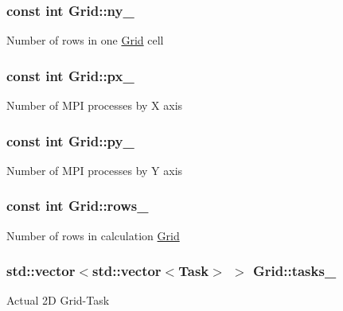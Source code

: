 \subsubsection[{\texorpdfstring{ny\+\_\+}{ny_}}]{\setlength{\rightskip}{0pt plus 5cm}const int Grid\+::ny\+\_\+\hspace{0.3cm}{\ttfamily [private]}}\hypertarget{classGrid_a017c2ce200149e3f6b9e1feec7432be3}{}\label{classGrid_a017c2ce200149e3f6b9e1feec7432be3}
Number of rows in one \hyperlink{classGrid}{Grid} cell 
\subsubsection[{\texorpdfstring{px\+\_\+}{px_}}]{\setlength{\rightskip}{0pt plus 5cm}const int Grid\+::px\+\_\+\hspace{0.3cm}{\ttfamily [private]}}\hypertarget{classGrid_a1f71da29e1b573e02fe09300cf676267}{}\label{classGrid_a1f71da29e1b573e02fe09300cf676267}
Number of M\+PI processes by X axis 
\subsubsection[{\texorpdfstring{py\+\_\+}{py_}}]{\setlength{\rightskip}{0pt plus 5cm}const int Grid\+::py\+\_\+\hspace{0.3cm}{\ttfamily [private]}}\hypertarget{classGrid_aaf0567036eb876642fcd38eb3eb83181}{}\label{classGrid_aaf0567036eb876642fcd38eb3eb83181}
Number of M\+PI processes by Y axis 
\subsubsection[{\texorpdfstring{rows\+\_\+}{rows_}}]{\setlength{\rightskip}{0pt plus 5cm}const int Grid\+::rows\+\_\+\hspace{0.3cm}{\ttfamily [private]}}\hypertarget{classGrid_abb5a6798827020c44faeb1730cdb52fd}{}\label{classGrid_abb5a6798827020c44faeb1730cdb52fd}
Number of rows in calculation \hyperlink{classGrid}{Grid} 
\subsubsection[{\texorpdfstring{tasks\+\_\+}{tasks_}}]{\setlength{\rightskip}{0pt plus 5cm}std\+::vector$<$std\+::vector$<${\bf Task}$>$ $>$ Grid\+::tasks\+\_\+\hspace{0.3cm}{\ttfamily [private]}}\hypertarget{classGrid_a352418004dcff916bfa9b3cdbd8cf0a4}{}\label{classGrid_a352418004dcff916bfa9b3cdbd8cf0a4}
Actual 2D Grid-\/\+Task 

